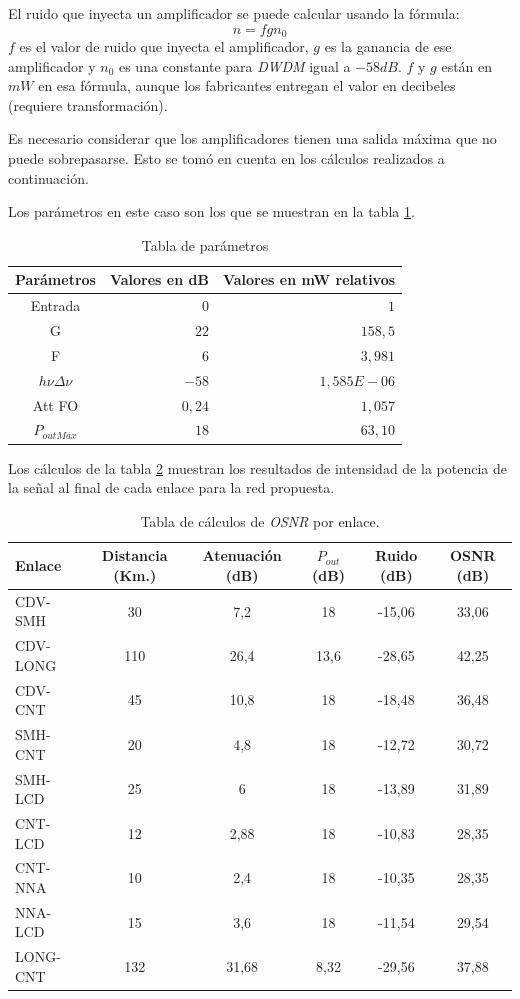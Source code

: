 El ruido que inyecta un amplificador se puede calcular usando la
fórmula: $$n = fgn_0$$ $f$ es el valor de ruido que inyecta el
amplificador, $g$ es la ganancia de ese amplificador y $n_0$ es una
constante para \emph{DWDM} igual a $-58 dB$. $f$ y $g$ están en $mW$
en esa fórmula, aunque los fabricantes entregan el valor en decibeles
(requiere transformación).

Es necesario considerar que los amplificadores tienen una salida
máxima que no puede sobrepasarse. Esto se tomó en cuenta en los
cálculos realizados a continuación.

Los parámetros en este caso son los que se muestran en la tabla
\ref{tab:parametros}.

\begin{table}[H]
  \centering
  \begin{tabular}{| c | r | r |}
    \hline
    Parámetros & Valores en dB & Valores en mW relativos \\
    \hline
    Entrada & $0$ & $1$ \\
    G & $22$ & $158,5$ \\
    F & $6$ & $3,981$ \\
    $h \nu \Delta \nu$ & $-58$ & $1,585E-06$ \\
    Att FO & $0,24$ & $1,057$ \\
    $P_{outMax}$ & $18$ & $63,10$ \\
    \hline
  \end{tabular}
  \caption{Tabla de parámetros}
  \label{tab:parametros}
\end{table}

Los cálculos de la tabla \ref{tab:osnr1} muestran los resultados de
intensidad de la potencia de la señal al final de cada enlace para
la red propuesta.

\begin{table}[H]
  \centering
  \begin{tabular}{| l | c | c | c | c | c |}
    \hline{}
    Enlace & Distancia (Km.) & Atenuación (dB) & $P_{out}$ (dB) & Ruido (dB) & OSNR (dB) \\

    \hline
    CDV-SMH  & 30  & 7,2   & 18   & -15,06 & 33,06 \\
    CDV-LONG & 110 & 26,4  & 13,6 & -28,65 & 42,25 \\
    CDV-CNT  & 45  & 10,8  & 18   & -18,48 & 36,48 \\
    SMH-CNT  & 20  & 4,8   & 18   & -12,72 & 30,72 \\
    SMH-LCD  & 25  & 6     & 18   & -13,89 & 31,89 \\
    CNT-LCD  & 12  & 2,88  & 18   & -10,83 & 28,35 \\
    CNT-NNA  & 10  & 2,4   & 18   & -10,35 & 28,35 \\
    NNA-LCD  & 15  & 3,6   & 18   & -11,54 & 29,54 \\
    LONG-CNT & 132 & 31,68 & 8,32 & -29,56 & 37,88 \\
    \hline
  \end{tabular}
  \caption{Tabla de cálculos de \emph{OSNR} por enlace.}
  \label{tab:osnr1}
\end{table}

